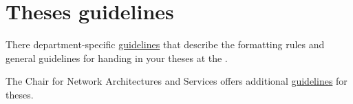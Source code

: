 \chapter{Theses guidelines}
\label{chap:guidelines}

There department-specific \href{https://www.in.tum.de/en/current-students/administrative-matters/thesis-guidelines-and-topics/}{\textcolor{TUMBlue}{guidelines}} that describe the formatting rules and general guidelines for handing in your theses at the \school.

The Chair for Network Architectures and Services offers additional \href{https://net.in.tum.de/theses/guidelines.pdf}{\textcolor{TUMBlue}{guidelines}} for theses.
